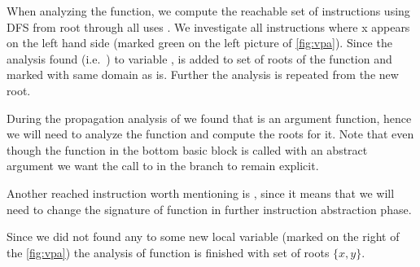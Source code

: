 \begin{example}\label{ex:vpa}
When analyzing the  function, we compute the reachable set of
instructions using DFS from root  through all uses
\cite{LLVM:langref}. We investigate all instructions where x appears on the
left hand side (marked green on the left picture of \autoref{fig:vpa}).
Since the analysis found  (i.e.~) to variable
,  is added to set of roots of the function  and
marked with same domain as  is. Further the analysis is repeated
from the new root.

During the propagation analysis of  we found that  is an
argument  function, hence we will need to analyze the 
function and compute the roots for it. Note that even though the 
function in the bottom basic block is called with an abstract argument we want
the call to  in the  branch to remain explicit.

Another reached instruction worth mentioning is , since it means that
we will need to change the signature of  function in further
instruction abstraction phase.

Since we did not found any  to some new local variable (marked on
the right of the \autoref{fig:vpa}) the analysis of  function is
finished with set of roots $\{x, y\}$.

\begin{figure} [!ht]
\begin{center}
\end{center}
\end{figure}
\end{example}
